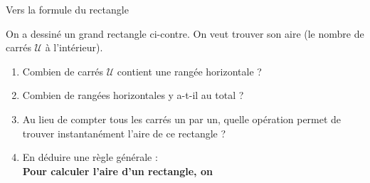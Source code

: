 \documentclass[a4paper]{book}
\begin{document}
   
    \begin{exerciceTitre}{Vers la formule du rectangle}

        \begin{minipage}{0.5\linewidth}
            On a dessiné un grand rectangle ci-contre. On veut trouver son aire (le nombre de carrés $\mathcal{U}$ à l'intérieur).
        \end{minipage}
        \hfill
        \begin{minipage}{0.49\linewidth}
            \begin{center}
            \end{center}
        \end{minipage}
        
        \begin{enumerate}
            \item Combien de carrés $\mathcal{U}$ contient une rangée horizontale ? \points[2]
            \item Combien de rangées horizontales y a-t-il au total ? \points[2]
            \item Au lieu de compter tous les carrés un par un, quelle opération permet de trouver instantanément l'aire de ce rectangle ? \newline
            \item En déduire une règle générale : \\
            \textbf{Pour calculer l'aire d'un rectangle, on } \points[10]
        \end{enumerate}
    \end{exerciceTitre}
    
\end{document}
